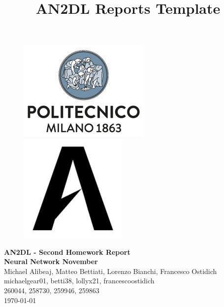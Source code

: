 \documentclass[11pt]{article}
\title{AN2DL Reports Template}
\begin{document}
    
    \begin{figure}[H]
        \raggedright
        \includegraphics[scale=0.4]{reports/images/polimi.png} \hfill \includegraphics[scale=0.3]{reports/images/airlab.jpeg}
    \end{figure}
    
    \vspace{5mm}
    
    \begin{center}
        {\Large \textbf{AN2DL - Second Homework Report}}\\
        \vspace{2mm}
        {\Large \textbf{Neural Network November}}\\
        \vspace{2mm}
        {\large Michael Alibeaj,}
        {\large Matteo Bettiati,}
        {\large Lorenzo Bianchi,}
        {\large Francesco Ostidich}\\
        \vspace{2mm}
        {michaelgear01,}
        {betti38,}
        {lollyx21,}
        {francescoostidich}\\
        \vspace{2mm}
        {260044,}
        {258730,}
        {259946,}
        {259863}\\
        \vspace{5mm}
        \today
    \end{center}    
    \vspace{5mm}
    
\end{document}

